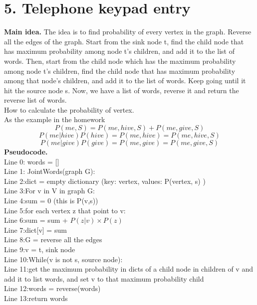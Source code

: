 \documentclass[11pt]{article}
\newcommand{\tab}{\hspace*{2em}}
\begin{document}
\section*{5. Telephone keypad entry}
\noindent
\Large{}
\textbf{Main idea.}
The idea is to find probability of every vertex in the graph. Reverse all the edges of the graph. Start from the sink node t, find the child node that has maximum probability among node t's children, and add it to the list of words. Then, start from the child node which has the maximum probability  among node t's children, find the child node that has maximum probability among that node's children, and add it to the list of words. Keep going until it hit the source node s. Now, we have a list of words, reverse it and return the reverse list of words.\\
How to calculate the probability of vertex.\\
As the example in the homework
$$P(me,S) = P(me, hive, S) + P(me, give, S)$$
$$P(me|hive) P(hive) = P(me,hive) = P(me,hive,S)$$
$$P(me|give) P(give) = P(me,give) = P(me,give,S)$$
\noindent
\textbf{Pseudocode.}\\
\large{}
Line 0: words = []\\
Line 1: JointWords(graph G):\\
Line 2:\tab dict = empty dictionary (key: vertex, values: P(vertex, s) )\\
Line 3:\tab For v in V in graph G:\\
Line 4:\tab\tab sum = 0 (this is P(v,s))\\
Line 5:\tab\tab for each vertex z that point to v:\\
Line 6:\tab\tab\tab sum = sum + $P(z|v) \times P(z)$\\
Line 7:\tab\tab dict[v] = sum\\
Line 8:\tab G = reverse all the edges\\
Line 9:\tab v = t, sink node\\
Line 10:\tab While(v is not s, source node):\\
Line 11:\tab\tab get the maximum probability in dicts of a child node in children of v and add it to list words, and set v to that maximum probability child\\
Line 12:\tab words = reverse(words)\\ 
Line 13:\tab return words\\
\end{document}
